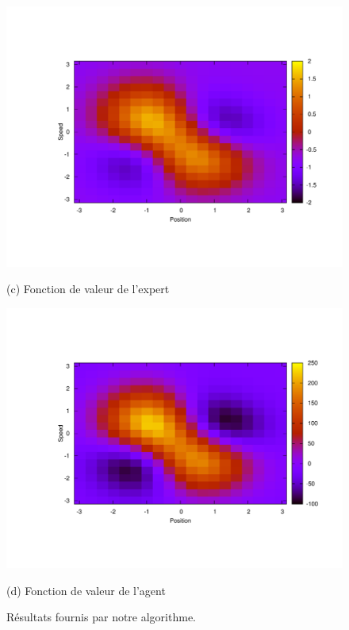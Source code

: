 \documentclass{article}
\begin{document}
\begin{figure}[tb]
\begin{minipage}[b]{.5\linewidth}
  \centerline{\includegraphics[width=1.2\linewidth]{LAFEM_Exp3_Vexpert.pdf}}
  \centerline{(c) Fonction de valeur de l'expert}%
\end{minipage}
\hfill
\begin{minipage}[b]{.5\linewidth}
  \centering
  \centerline{\includegraphics[width=1.2\linewidth]{LAFEM_Exp3_Vagent.pdf}}
  \centerline{(d) Fonction de valeur de l'agent}%
\end{minipage}
%
\caption{Résultats fournis par notre algorithme.}
\label{onlyFig.fig}
%
\vspace{-5pt}
\end{figure}
\end{document}
